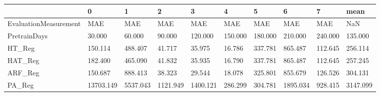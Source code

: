\begin{tabular}{llllllllll}
\toprule
{} &         0 &        1 &        2 &        3 &       4 &       5 &        6 &       7 &     mean \\
\midrule
EvaluationMeasurement &       MAE &      MAE &      MAE &      MAE &     MAE &     MAE &      MAE &     MAE &      NaN \\
PretrainDays          &    30.000 &   60.000 &   90.000 &  120.000 & 150.000 & 180.000 &  210.000 & 240.000 &  135.000 \\
HT\_Reg                &   150.114 &  488.407 &   41.717 &   35.975 &  16.786 & 337.781 &  865.487 & 112.645 &  256.114 \\
HAT\_Reg               &   182.400 &  465.090 &   41.832 &   35.935 &  16.790 & 337.781 &  865.487 & 112.645 &  257.245 \\
ARF\_Reg               &   150.687 &  888.413 &   38.323 &   29.544 &  18.078 & 325.801 &  855.679 & 126.526 &  304.131 \\
PA\_Reg                & 13703.149 & 5537.043 & 1121.949 & 1400.121 & 286.299 & 304.781 & 1895.034 & 928.415 & 3147.099 \\
\bottomrule
\end{tabular}
